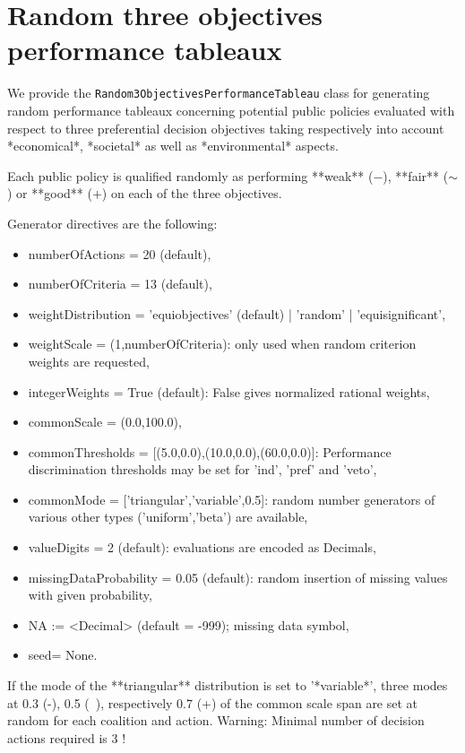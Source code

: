  \section{Random three objectives performance tableaux}
\label{sec:5.4}

We provide the \texttt{Random3ObjectivesPerformanceTableau} class for generating random performance tableaux concerning potential public policies evaluated with respect to three preferential decision objectives taking respectively into account *economical*, *societal* as well as *environmental* aspects.

Each public policy is qualified randomly as performing **weak** ($-$), **fair** ($\sim$) or **good** ($+$) on each of the three objectives. 

Generator directives are the following:
\begin{itemize}
\item numberOfActions = 20 (default),
\item numberOfCriteria = 13 (default),
\item weightDistribution = 'equiobjectives' (default) | 'random' | 'equisignificant',
\item weightScale = (1,numberOfCriteria): only used when random criterion weights are requested,
\item integerWeights = True (default): False gives normalized rational weights, 
\item commonScale = (0.0,100.0),
\item commonThresholds = [(5.0,0.0),(10.0,0.0),(60.0,0.0)]: Performance discrimination thresholds may be set for 'ind', 'pref' and 'veto',  
\item commonMode = ['triangular','variable',0.5]: random number generators of various other types ('uniform','beta') are available,
\item valueDigits = 2 (default): evaluations are encoded as Decimals,
\item missingDataProbability = 0.05 (default): random insertion of missing values with given probability,  
\item NA := <Decimal> (default = -999); missing data symbol,
\item seed= None. 
\end{itemize}

\begin{svgraybox}If the mode of the **triangular** distribution is set to '*variable*', three modes at 0.3 (-), 0.5 (~), respectively 0.7 (+) of the common scale span are set at random for each coalition and action. Warning: Minimal number of decision actions required is 3 ! 
\end{svgraybox}

